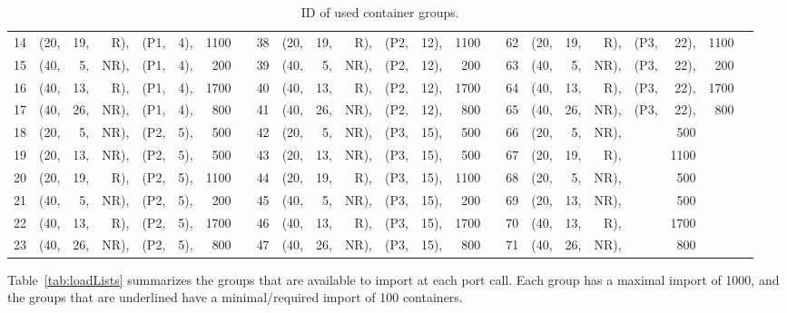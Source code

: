 \begin{table}[h!]
\begin{center}
\begin{scriptsize}
\begin{tabular}{*{3}{@{\hskip15pt}r|*{5}{r@{\hskip3pt}}rc}}
  14&(20,&19,& R),&(P1,& 4),&1100&  &       38&(20,&19,& R),&(P2,&12),&1100&  &     62&(20,&19,& R),&(P3,&22),&1100\\
  15&(40,& 5,&NR),&(P1,& 4),& 200&  &       39&(40,& 5,&NR),&(P2,&12),& 200&  &     63&(40,& 5,&NR),&(P3,&22),& 200\\
  16&(40,&13,& R),&(P1,& 4),&1700&  &       40&(40,&13,& R),&(P2,&12),&1700&  &     64&(40,&13,& R),&(P3,&22),&1700\\
  17&(40,&26,&NR),&(P1,& 4),& 800&  &       41&(40,&26,&NR),&(P2,&12),& 800&  &     65&(40,&26,&NR),&(P3,&22),& 800\\
  18&(20,& 5,&NR),&(P2,& 5),& 500&  &       42&(20,& 5,&NR),&(P3,&15),& 500&  &     66&(20,& 5,&NR),&& 500\\
  19&(20,&13,&NR),&(P2,& 5),& 500&  &       43&(20,&13,&NR),&(P3,&15),& 500&  &     67&(20,&19,& R),&&1100\\
  20&(20,&19,& R),&(P2,& 5),&1100&  &       44&(20,&19,& R),&(P3,&15),&1100&  &     68&(20,& 5,&NR),&& 500\\
  21&(40,& 5,&NR),&(P2,& 5),& 200&  &       45&(40,& 5,&NR),&(P3,&15),& 200&  &     69&(20,&13,&NR),&& 500\\
  22&(40,&13,& R),&(P2,& 5),&1700&  &       46&(40,&13,& R),&(P3,&15),&1700&  &     70&(40,&13,& R),&&1700\\
  23&(40,&26,&NR),&(P2,& 5),& 800&  &       47&(40,&26,&NR),&(P3,&15),& 800&  &     71&(40,&26,&NR),&& 800\\
\end{tabular}
\caption{ID of used container groups.}\label{tab:groupIDs}
\end{scriptsize}
\end{center}
\end{table}

Table~\ref{tab:loadLists} summarizes the groups that are available to import at each port call. Each group has a maximal import of 1000, and the groups that are underlined have a minimal/required import of 100 containers.
  
